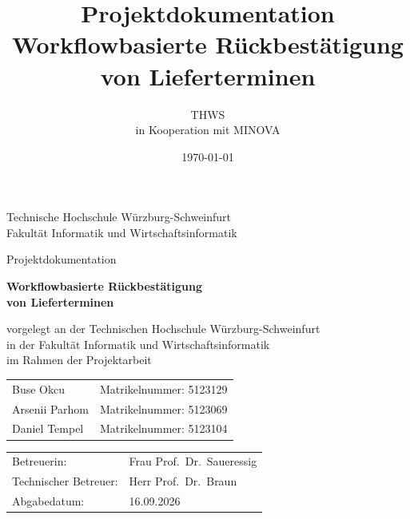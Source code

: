 \documentclass[
12pt,
a4paper
]{article}
\title{
\Huge Projektdokumentation\\[0.5cm]
\Large Workflowbasierte Rückbestätigung von Lieferterminen
}
\author{
THWS \\[0.2cm]
in Kooperation mit MINOVA
}
\date{\today}
\begin{document}

\begin{titlepage}
\thispagestyle{empty}

\begin{center}

{\Large
Technische Hochschule Würzburg-Schweinfurt\\
Fakultät Informatik und Wirtschaftsinformatik
}

\vspace{2.8cm}

{\Large Projektdokumentation}

\vspace{0.8cm}

{\Huge\bfseries
Workflowbasierte Rückbestätigung\\
von Lieferterminen
}

\vspace{1.8cm}

{\normalsize
vorgelegt an der Technischen Hochschule Würzburg-Schweinfurt\\
in der Fakultät Informatik und Wirtschaftsinformatik\\
im Rahmen der Projektarbeit
}

\vspace{2cm}

\begin{tabular}{ll}
Buse Okcu     & Matrikelnummer: 5123129 \\
Arsenii Parhom & Matrikelnummer: 5123069 \\
Daniel Tempel  & Matrikelnummer: 5123104
\end{tabular}

\vfill

\begin{tabular}{ll}
Betreuerin: & Frau Prof.\ Dr.\ Saueressig \\[0.4cm]
Technischer Betreuer: & Herr Prof.\ Dr.\ Braun \\[0.4cm]
Abgabedatum: & 16.09.2026
\end{tabular}

\end{center}

\end{titlepage}

\tableofcontents
\newpage
















\clearpage
\end{document}
